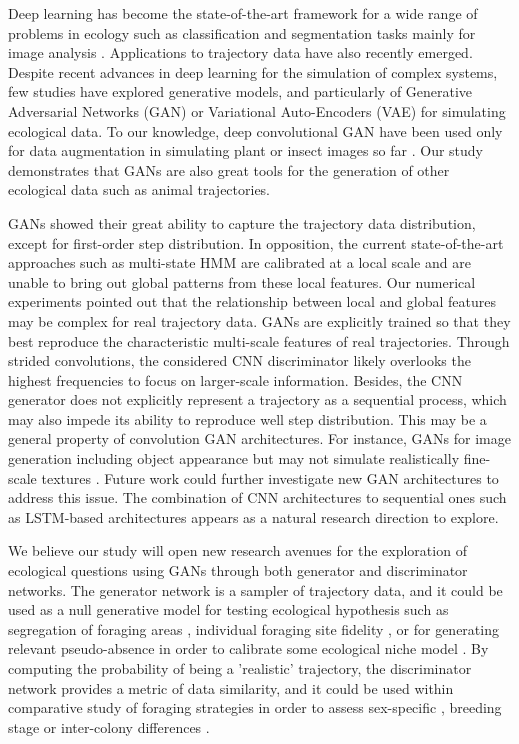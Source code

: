 \documentclass{article}
\begin{document}
Deep learning has become the state-of-the-art framework for a wide range of problems in ecology such as classification and segmentation tasks mainly for image analysis \citep{weinstein_computer_2018, christin_applications_2019}. Applications to trajectory data \citep{browning_predicting_2018,peng_deep_2019,roy_deep_2021} have also recently emerged. Despite recent advances in deep learning for the simulation of complex systems, few studies have explored generative models, and particularly of Generative Adversarial Networks (GAN) or Variational Auto-Encoders (VAE) for simulating ecological data. To our knowledge, deep convolutional GAN have been used only for data augmentation in simulating plant or insect images so far \citep{giuffrida_arigan_2017,lu_generative_2019,madsen_generating_2019,silva_improved_2021}. Our study demonstrates that GANs are also great tools for the generation of other ecological data such as animal trajectories.

GANs showed their great ability to capture the trajectory data distribution, except for first-order step distribution. In opposition, the current state-of-the-art approaches such as multi-state HMM are calibrated at a local scale and are unable to bring out global patterns from these local features. Our numerical experiments pointed out that the relationship between local and global features may be complex for real trajectory data. GANs are explicitly trained so that they best reproduce the characteristic multi-scale features of real trajectories. Through strided convolutions, the considered CNN discriminator likely overlooks the highest frequencies to focus on larger-scale information. Besides, the CNN generator does not explicitly represent a trajectory as a sequential process, which may also impede its ability to reproduce well step distribution. This may be a general property of convolution GAN architectures. For instance, GANs for image generation including object appearance but may not simulate realistically fine-scale textures \cite{cao_recent_2019}. Future work could further investigate new GAN architectures to address this issue. The combination of CNN architectures to sequential ones such as LSTM-based architectures appears as a natural research direction to explore.  

We believe our study will open new research avenues for the exploration of ecological questions using GANs through both generator and discriminator networks. The generator network is a sampler of trajectory data, and it could be used as a null generative model for testing ecological hypothesis such as segregation of foraging areas \citep{bolton_review_2019}, individual foraging site fidelity \citep{owen_breeding_2019}, or for generating relevant pseudo-absence in order to calibrate some ecological niche model \citep{huckstadt_projected_2020}. By computing the probability of being a 'realistic' trajectory, the discriminator network provides a metric of data similarity, and it could be used within comparative study of foraging strategies in order to assess sex-specific \citep{lewis_sex-specific_2005}, breeding stage \citep{lerma_breeding_2020} or inter-colony differences \citep{harding_does_2013}. 
\end{document}
